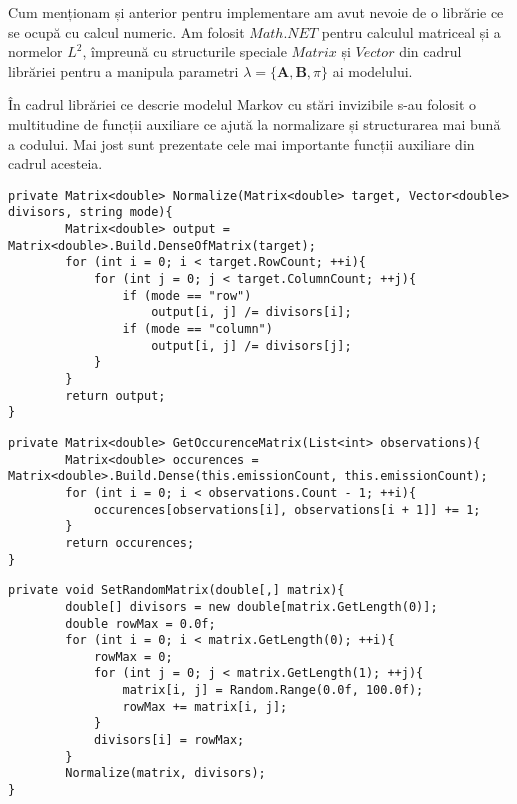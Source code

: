 Cum menționam și anterior pentru implementare am avut nevoie de o librărie ce se ocupă cu calcul numeric. Am folosit $Math.NET$ pentru calculul matriceal și a normelor $L^{2}$, împreună cu structurile speciale $Matrix$ și $Vector$ din cadrul librăriei pentru a manipula parametri $\lambda = \{\textbf{A},\textbf{B},\pi\}$ ai modelului.\par

În cadrul librăriei ce descrie modelul Markov cu stări invizibile s-au folosit o multitudine de funcții auxiliare ce ajută la normalizare și structurarea mai bună a codului. Mai jost sunt prezentate cele mai importante funcții auxiliare din cadrul acesteia.\par

\begin{lstlisting}[caption=Funcție auxiliară ce realizează normalizarea]
private Matrix<double> Normalize(Matrix<double> target, Vector<double> divisors, string mode){
        Matrix<double> output = Matrix<double>.Build.DenseOfMatrix(target);
        for (int i = 0; i < target.RowCount; ++i){
            for (int j = 0; j < target.ColumnCount; ++j){
                if (mode == "row")
                    output[i, j] /= divisors[i];
                if (mode == "column")
                    output[i, j] /= divisors[j];
            }
        }
        return output;
}
\end{lstlisting}


\begin{lstlisting}[caption=Funcție auxiliară ce construiește matricea de frecvență $C$]
private Matrix<double> GetOccurenceMatrix(List<int> observations){
        Matrix<double> occurences = Matrix<double>.Build.Dense(this.emissionCount, this.emissionCount);
        for (int i = 0; i < observations.Count - 1; ++i){
            occurences[observations[i], observations[i + 1]] += 1;
        }
        return occurences;
}
\end{lstlisting}

\begin{lstlisting}[caption=Funcție auxiliară ce contruiește o matrice cu intrări aleatoare]
private void SetRandomMatrix(double[,] matrix){
        double[] divisors = new double[matrix.GetLength(0)];
        double rowMax = 0.0f;
        for (int i = 0; i < matrix.GetLength(0); ++i){
            rowMax = 0;
            for (int j = 0; j < matrix.GetLength(1); ++j){
                matrix[i, j] = Random.Range(0.0f, 100.0f);
                rowMax += matrix[i, j];
            }
            divisors[i] = rowMax;
        }
        Normalize(matrix, divisors);
}
\end{lstlisting}
\clearpage

